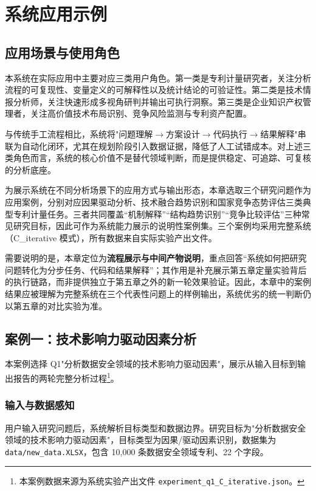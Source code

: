 
\section{系统应用示例}

\subsection{应用场景与使用角色}

本系统在实际应用中主要对应三类用户角色。第一类是专利计量研究者，关注分析流程的可复现性、变量定义的可解释性以及统计结论的可验证性。第二类是技术情报分析师，关注快速形成多视角研判并输出可执行洞察。第三类是企业知识产权管理者，关注高价值技术布局识别、竞争风险监测与专利资产配置。

与传统手工流程相比，系统将"问题理解$\rightarrow$方案设计$\rightarrow$代码执行$\rightarrow$结果解释"串联为自动化闭环，尤其在规划阶段引入数据证据，降低了人工试错成本。对上述三类角色而言，系统的核心价值不是替代领域判断，而是提供稳定、可追踪、可复核的分析底座。

为展示系统在不同分析场景下的应用方式与输出形态，本章选取三个研究问题作为应用案例，分别对应因果驱动分析、技术融合趋势识别和国家竞争态势评估三类典型专利计量任务。三者共同覆盖“机制解释”“结构趋势识别”“竞争比较评估”三种常见研究目标，因此可作为系统能力展示的说明性案例集。三个案例均采用完整系统（C\_iterative 模式），所有数据来自实际实验产出文件。

需要说明的是，本章定位为\textbf{流程展示与中间产物说明}，重点回答“系统如何把研究问题转化为分步任务、代码和结果解释”；其作用是补充展示第五章定量实验背后的执行链路，而非提供独立于第五章之外的新一轮效果验证。因此，本章中的案例结果应被理解为完整系统在三个代表性问题上的样例输出，系统优劣的统一判断仍以第五章的对比实验为准。

\subsection{案例一：技术影响力驱动因素分析}

本案例选择 Q1"分析数据安全领域的技术影响力驱动因素"，展示从输入目标到输出报告的两轮完整分析过程\footnote{本案例数据来源为系统实验产出文件 \texttt{experiment\_q1\_C\_iterative.json}。}。

\subsubsection{输入与数据感知}

用户输入研究问题后，系统解析目标类型和数据边界。研究目标为"分析数据安全领域的技术影响力驱动因素"，目标类型为因果/驱动因素识别，数据集为 \texttt{data/new\_data.XLSX}，包含 10,000 条数据安全领域专利、22 个字段。

